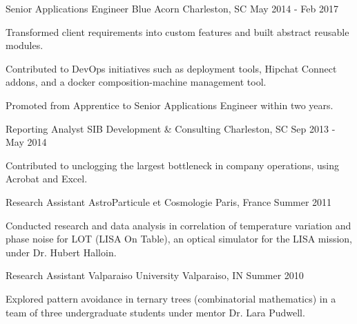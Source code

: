 \begin{cventries}
  \cventry
    {Senior Applications Engineer}
    {Blue Acorn}
    {Charleston, SC}
    {May 2014 - Feb 2017}
    {
      \begin{cvitems}
        \item {Transformed client requirements into custom features and built abstract reusable modules.}
        \item {Contributed to DevOps initiatives such as deployment tools, Hipchat Connect addons, and a docker composition-machine management tool.}
        \item {Promoted from Apprentice to Senior Applications Engineer within two years.}
      \end{cvitems}
    }
  \cventry
    {Reporting Analyst}
    {SIB Development \& Consulting}
    {Charleston, SC}
    {Sep 2013 - May 2014}
    {
      \begin{cvitems}
        \item {Contributed to unclogging the largest bottleneck in company operations, using Acrobat and Excel.}
      \end{cvitems}
    }
  \cventry
    {Research Assistant}
    {AstroParticule et Cosmologie}
    {Paris, France}
    {Summer 2011}
    {
      \begin{cvitems}
        \item {Conducted research and data analysis in correlation of temperature variation and phase noise for LOT (LISA On Table), an optical simulator for the LISA mission, under Dr. Hubert Halloin.}
      \end{cvitems}
    }
  \cventry
    {Research Assistant}
    {Valparaiso University}
    {Valparaiso, IN}
    {Summer 2010}
    {
      \begin{cvitems}
        \item {Explored pattern avoidance in ternary trees (combinatorial mathematics) in a team of three undergraduate students under mentor Dr. Lara Pudwell.}
      \end{cvitems}
    }
\end{cventries}
